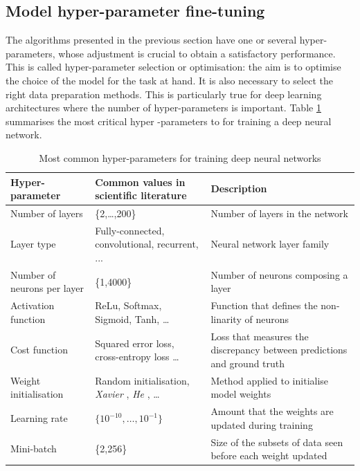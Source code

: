 \subsection{Model hyper-parameter fine-tuning} \label{Model hyper-parameters fine-tuning}

The algorithms presented in the previous section have one or several hyper-parameters, whose adjustment is crucial to obtain a satisfactory performance. This is called hyper-parameter selection or optimisation: the aim is to optimise the choice of the model for the task at hand. It is also necessary to select the right data preparation methods. This is particularly true for deep learning architectures where the number of hyper-parameters is important. Table \ref{tab:hyper-parameters} summarises the most critical hyper -parameters to for training a deep neural network.

\begin{table}
\caption{Most common hyper-parameters for training deep neural networks}
\label{tab:hyper-parameters}
\begin{tabular}{lp{4cm}p{4cm}}
\hline
\textbf{Hyper-parameter}           &  \textbf{Common values in scientific literature}  & \textbf{Description}                                    \\ \hline
Number of layers          & \{2,\ldots,200\}                                     & Number of layers in the network           \\ \hline
Layer type                & Fully-connected, convolutional, recurrent, ... & Neural network layer family                                               \\ \hline
Number of neurons per layer & \{1,4000\}                                    & Number of neurons composing a layer                                               \\ \hline
Activation function       & ReLu, Softmax, Sigmoid, Tanh, \dots               & Function that defines the non-linarity of neurons                                                \\ \hline
Cost function             & Squared error loss, cross-entropy loss \dots                                                & Loss that measures the discrepancy between predictions and ground truth                                               \\ \hline
Weight initialisation     & Random initialisation, \textit{Xavier} \citep{glorot2010understanding}, \textit{He} \citep{he2015delving}, \dots                                                & Method applied to initialise model weights \\ \hline
Learning rate             & $\{10^{-10},\ldots,10^{-1}\}$                                                  &  Amount that the weights are updated during training                                               \\ \hline
Mini-batch                & \{2,256\}                                     & Size of the subsets of data seen before each weight updated                                               \\ \hline
\end{tabular}
\end{table}

